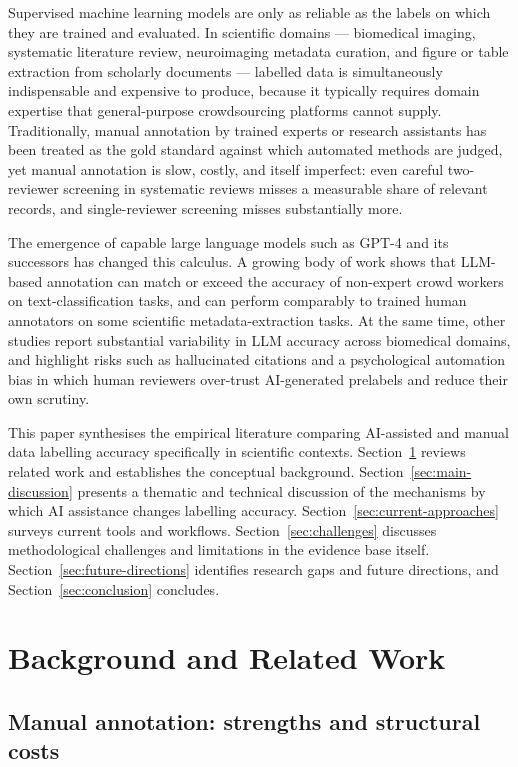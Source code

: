 \documentclass[acmsmall,nonacm]{acmart}
\begin{document}
Supervised machine learning models are only as reliable as the labels on which they are trained and evaluated. In scientific domains --- biomedical imaging, systematic literature review, neuroimaging metadata curation, and figure or table extraction from scholarly documents --- labelled data is simultaneously indispensable and expensive to produce, because it typically requires domain expertise that general-purpose crowdsourcing platforms cannot supply. Traditionally, manual annotation by trained experts or research assistants has been treated as the gold standard against which automated methods are judged, yet manual annotation is slow, costly, and itself imperfect: even careful two-reviewer screening in systematic reviews misses a measurable share of relevant records, and single-reviewer screening misses substantially more.

The emergence of capable large language models such as GPT-4 and its successors has changed this calculus. A growing body of work shows that LLM-based annotation can match or exceed the accuracy of non-expert crowd workers on text-classification tasks, and can perform comparably to trained human annotators on some scientific metadata-extraction tasks. At the same time, other studies report substantial variability in LLM accuracy across biomedical domains, and highlight risks such as hallucinated citations and a psychological automation bias in which human reviewers over-trust AI-generated prelabels and reduce their own scrutiny.

This paper synthesises the empirical literature comparing AI-assisted and manual data labelling accuracy specifically in scientific contexts. Section~\ref{sec:background} reviews related work and establishes the conceptual background. Section~\ref{sec:main-discussion} presents a thematic and technical discussion of the mechanisms by which AI assistance changes labelling accuracy. Section~\ref{sec:current-approaches} surveys current tools and workflows. Section~\ref{sec:challenges} discusses methodological challenges and limitations in the evidence base itself. Section~\ref{sec:future-directions} identifies research gaps and future directions, and Section~\ref{sec:conclusion} concludes.

\section{Background and Related Work}
\label{sec:background}

\subsection{Manual annotation: strengths and structural costs}
\label{subsec:manual-annotation}
\end{document}

